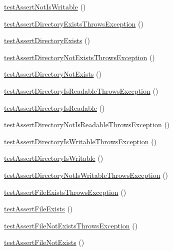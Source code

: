 \begin{DoxyCompactItemize}
\item 
\mbox{\hyperlink{class_framework___assert_test_ab28efb575cd0891f493b17142533b96a}{test\+Assert\+Not\+Is\+Writable}} ()
\item 
\mbox{\hyperlink{class_framework___assert_test_a43ecf5315004f08fb0d2034e425d4183}{test\+Assert\+Directory\+Exists\+Throws\+Exception}} ()
\item 
\mbox{\hyperlink{class_framework___assert_test_a9076fe312eeed9e2f6b6a04ad796399d}{test\+Assert\+Directory\+Exists}} ()
\item 
\mbox{\hyperlink{class_framework___assert_test_ab0954e97c2bc8a0bac239052ec43fd4c}{test\+Assert\+Directory\+Not\+Exists\+Throws\+Exception}} ()
\item 
\mbox{\hyperlink{class_framework___assert_test_ace12e5a1ae104a2ff26bc9ef03151240}{test\+Assert\+Directory\+Not\+Exists}} ()
\item 
\mbox{\hyperlink{class_framework___assert_test_a7a963fa2d9a01383b899f852267c1ca4}{test\+Assert\+Directory\+Is\+Readable\+Throws\+Exception}} ()
\item 
\mbox{\hyperlink{class_framework___assert_test_a49af011f54fa10461d9e7299e84b8f22}{test\+Assert\+Directory\+Is\+Readable}} ()
\item 
\mbox{\hyperlink{class_framework___assert_test_af18cb8f08280dd252f171b3b7ec00d62}{test\+Assert\+Directory\+Not\+Is\+Readable\+Throws\+Exception}} ()
\item 
\mbox{\hyperlink{class_framework___assert_test_ab69e2a144049f545014fd79c0a8ff327}{test\+Assert\+Directory\+Is\+Writable\+Throws\+Exception}} ()
\item 
\mbox{\hyperlink{class_framework___assert_test_aba8deb189fd226ba9baa9ecf43e7227a}{test\+Assert\+Directory\+Is\+Writable}} ()
\item 
\mbox{\hyperlink{class_framework___assert_test_afea8e816e453d5a110a3691ac5e7b0b6}{test\+Assert\+Directory\+Not\+Is\+Writable\+Throws\+Exception}} ()
\item 
\mbox{\hyperlink{class_framework___assert_test_ae000abcccc5648c8bd8cbf1a5767b995}{test\+Assert\+File\+Exists\+Throws\+Exception}} ()
\item 
\mbox{\hyperlink{class_framework___assert_test_a7579550350b85a793326617a353d1a6c}{test\+Assert\+File\+Exists}} ()
\item 
\mbox{\hyperlink{class_framework___assert_test_aec2e9bbdfa7aa21d078014192dec49cd}{test\+Assert\+File\+Not\+Exists\+Throws\+Exception}} ()
\item 
\mbox{\hyperlink{class_framework___assert_test_a4d2ca476f09668cbad6cf48a5ee673ba}{test\+Assert\+File\+Not\+Exists}} ()

\end{DoxyCompactItemize}
